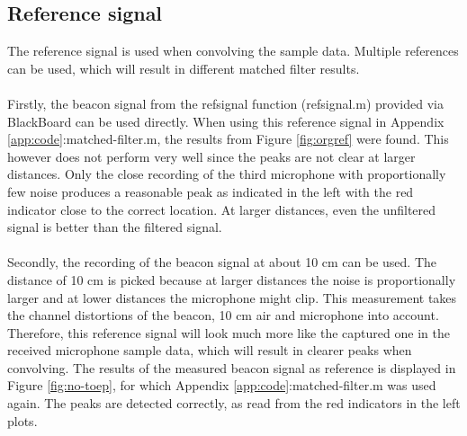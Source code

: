 \documentclass[final]{scrreprt} %
\begin{document}
\subsection{Reference signal}
The reference signal is used when convolving the sample data.
Multiple references can be used, which will result in different matched filter results.
\\ \\
Firstly, the beacon signal from the refsignal function (refsignal.m) provided via BlackBoard can be used directly.
When using this reference signal in Appendix \ref{app:code}:matched-filter.m, the results from Figure \ref{fig:orgref} were found.
This however does not perform very well since the peaks are not clear at larger distances.
Only the close recording of the third microphone with proportionally few noise produces a reasonable peak as indicated in the left with the red indicator close to the correct location.
At larger distances, even the unfiltered signal is better than the filtered signal.
\\ \\
Secondly, the recording of the beacon signal at about 10 cm can be used.
The distance of 10 cm is picked because at larger distances the noise is proportionally larger and at lower distances the microphone might clip.
This measurement takes the channel distortions of the beacon, 10 cm air and microphone into account.
Therefore, this reference signal will look much more like the captured one in the received microphone sample data, which will result in clearer peaks when convolving.
The results of the measured beacon signal as reference is displayed in Figure \ref{fig:no-toep}, for which Appendix \ref{app:code}:matched-filter.m was used again.
The peaks are detected correctly, as read from the red indicators in the left plots.
\end{document}
